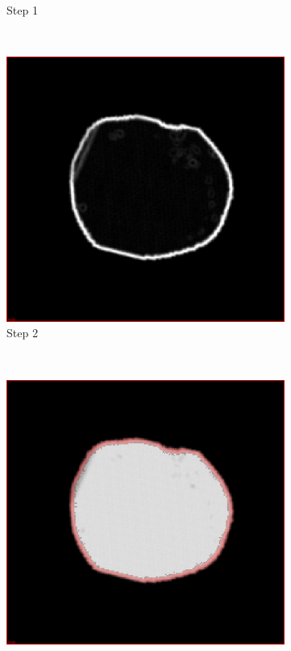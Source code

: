 \begin{figure}[h]
\begin{subfigure}[b]{0.3\textwidth}
    \caption{Step 1}
    \label{fig:erosion1}
  \end{subfigure}  
  ~ %
  \begin{subfigure}[b]{0.3\textwidth}
    \includegraphics[width=\textwidth]{images/erosion_2.png}
    \caption{Step 2}
    \label{fig:erosion2}
  \end{subfigure}
  ~ %
  \begin{subfigure}[b]{0.3\textwidth}
    \includegraphics[width=\textwidth]{images/erosion_3.png}

\end{subfigure}
\end{figure}
